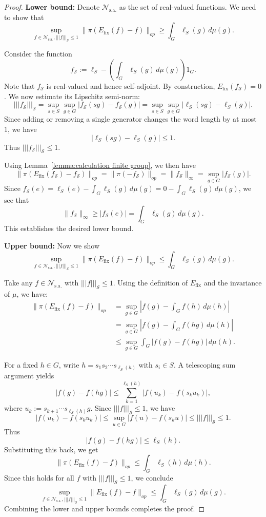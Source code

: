 \documentclass[10pt,a4paper]{amsart}
\newcommand{\fix}{\mathrm{fix}}
\newcommand{\mc}{\mathcal}
\begin{document}
\begin{proof}
\textbf{Lower bound:} Denote $\mc N_{\mathrm{s.a.}}$ as the set of real-valued functions. We need to show that 
\[
    \sup_{f \in \mc N_{\mathrm{s.a.}}, |||f|||_{\mc S} \le 1} \|\pi(E_{\fix}(f) - f)\|_{op} \ge \int_G \ell_{S}(g) \, d\mu(g).
\]

Consider the function 
\[
    f_{\mc S} := \ell_{S} - \left(\int_G \ell_{S}(g)\, d\mu(g)\right) 1_G.
\]
Note that $f_{\mc S}$ is real-valued and hence self-adjoint. By construction, $E_{\fix}(f_{\mc S}) = 0$. We now estimate its Lipschitz semi-norm:
\[
    |||f_{\mc S}|||_{\mc S} = \sup_{s \in S} \sup_{g \in G} |f_{\mc S}(sg) - f_{\mc S}(g)| = \sup_{s \in S} \sup_{g \in G} |\ell_{S}(sg) - \ell_{S}(g)|.
\]
Since adding or removing a single generator changes the word length by at most $1$, we have 
\[
    |\ell_{S}(sg) - \ell_{S}(g)| \le 1.
\]
Thus $|||f_{\mc S}|||_{\mc S} \le 1$.

Using Lemma~\ref{lemma:calculation finite group}, we then have
\[
    \|\pi(E_{\fix}(f_{\mc S}) - f_{\mc S})\|_{op} = \|\pi(-f_{\mc S})\|_{op} = \|f_{\mc S}\|_{\infty} = \sup_{g \in G} |f_{\mc S}(g)|.
\]
Since $f_{\mc S}(e) = \ell_{S}(e) - \int_G \ell_{S}(g)\, d\mu(g) = 0 - \int_G \ell_{S}(g)\, d\mu(g)$, we see that
\[
    \|f_{\mc S}\|_{\infty} \ge |f_{\mc S}(e)| = \int_G \ell_{S}(g)\, d\mu(g).
\]
This establishes the desired lower bound.

\medskip

\textbf{Upper bound:} Now we show
\[
    \sup_{f \in \mc N_{\mathrm{s.a.}}, |||f|||_{\mc S} \le 1} \|\pi(E_{\fix}(f) - f)\|_{op} \le \int_G \ell_{S}(g) \, d\mu(g).
\]

Take any $f \in \mc N_{\mathrm{s.a.}}$ with $|||f|||_{\mc S} \le 1$. Using the definition of $E_{\fix}$ and the invariance of $\mu$, we have:
\begin{align*}
    \|\pi(E_{\fix}(f) - f)\|_{op} &= \sup_{g \in G} \left| f(g) - \int_G f(h) \, d\mu(h) \right| \\
    &= \sup_{g \in G} \left| f(g) - \int_G f(hg) \, d\mu(h) \right| \\
    &\le \sup_{g \in G} \int_G |f(g) - f(hg)| \, d\mu(h).
\end{align*}

For a fixed $h \in G$, write $h = s_1 s_2 \cdots s_{\ell_S(h)}$ with $s_i \in S$. A telescoping sum argument yields
\[
    |f(g) - f(hg)| \le \sum_{k=1}^{\ell_S(h)} |f(u_k) - f(s_k u_k)|,
\]
where $u_k := s_{k+1}\cdots s_{\ell_S(h)}g$. Since $|||f|||_{\mc S} \le 1$, we have
\[
    |f(u_k) - f(s_k u_k)| \le \sup_{u \in G} |f(u) - f(s_k u)| \le |||f|||_{\mc S} \le 1.
\]
Thus
\[
    |f(g) - f(hg)| \le \ell_{S}(h).
\]
Substituting this back, we get
\[
    \|\pi(E_{\fix}(f) - f)\|_{op} \le \int_G \ell_{S}(h) \, d\mu(h).
\]
Since this holds for all $f$ with $|||f|||_{\mc S} \le 1$, we conclude
\[
    \sup_{f \in \mc N_{\mathrm{s.a.}}, |||f|||_{\mc S} \le 1} \|E_{\fix}(f) - f\|_{op} \le \int_G \ell_{S}(g) \, d\mu(g).
\]
Combining the lower and upper bounds completes the proof.
\end{proof}
\end{document}
